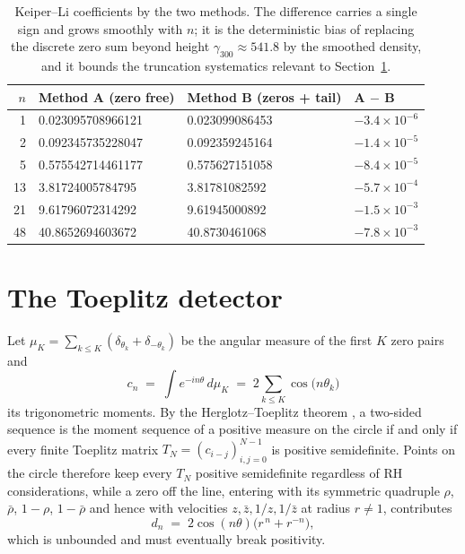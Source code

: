 \documentclass[11pt,oneside]{article}
\theoremstyle{remark}
\begin{document}
\begin{table}[ht]
\centering
\begin{tabular}{rlll}
\toprule
$n$ & Method A (zero free) & Method B (zeros + tail) & A $-$ B \\
\midrule
1  & 0.023095708966121 & 0.023099086453 & $-3.4\times10^{-6}$ \\
2  & 0.092345735228047 & 0.092359245164 & $-1.4\times10^{-5}$ \\
5  & 0.575542714461177 & 0.575627151058 & $-8.4\times10^{-5}$ \\
13 & 3.81724005784795  & 3.81781082592  & $-5.7\times10^{-4}$ \\
21 & 9.61796072314292  & 9.61945000892  & $-1.5\times10^{-3}$ \\
48 & 40.8652694603672  & 40.8730461068  & $-7.8\times10^{-3}$ \\
\bottomrule
\end{tabular}
\caption{Keiper--Li coefficients by the two methods. The difference carries a
single sign and grows smoothly with $n$; it is the deterministic bias of
replacing the discrete zero sum beyond height $\gamma_{300} \approx 541.8$ by
the smoothed density, and it bounds the truncation systematics relevant to
Section~\ref{sec:detector}.}
\label{tab:lambda}
\end{table}

\section{The Toeplitz detector}\label{sec:detector}

Let $\mu_K = \sum_{k \le K}(\delta_{\theta_k} + \delta_{-\theta_k})$ be the
angular measure of the first $K$ zero pairs and
\begin{equation}
c_n \;=\; \int e^{-in\theta}\, d\mu_K \;=\; 2\sum_{k\le K}\cos\bigl(n\theta_k\bigr)
\end{equation}
its trigonometric moments. By the Herglotz--Toeplitz theorem
\cite{GrenanderSzego}, a two-sided sequence is the moment sequence of a
positive measure on the circle if and only if every finite Toeplitz matrix
$T_N = (c_{i-j})_{i,j=0}^{N-1}$ is positive semidefinite. Points on the circle
therefore keep every $T_N$ positive semidefinite regardless of RH
considerations, while a zero off the line, entering with its symmetric
quadruple $\rho$, $\bar\rho$, $1-\rho$, $1-\bar\rho$ and hence with velocities
$z, \bar z, 1/z, 1/\bar z$ at radius $r \ne 1$, contributes
\begin{equation}\label{eq:dev}
d_n \;=\; 2\cos(n\theta)\bigl(r^{\,n} + r^{-n}\bigr),
\end{equation}
which is unbounded and must eventually break positivity.
\end{document}
